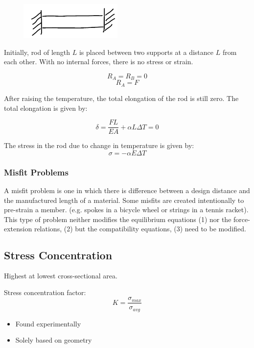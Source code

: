 \begin{figure}[!h]
\centering
\includegraphics[angle=0, width=2in]{Axial Loading-Figures/Temperature_TwoPlates.png}
\vspace{-2mm}
\caption{\small {}}
\vspace{-3mm}
\label{Fig:TempNoLoad}
\end{figure}

\noindent Initially, rod of length $L$ is placed between two supports at a distance $L$ from each other. With no internal forces, there is no stress or strain.

\[R_{A} = R_{B} = 0\]
\[R_{A} = F\]
                  
\noindent After raising the temperature, the total elongation of the rod is still zero. The total elongation is given by:

\[\delta = \frac{FL}{EA} + \alpha L \Delta T = 0\]

\noindent The stress in the rod due to change in temperature is given by:
\[\sigma = -\alpha E \Delta T\]

\subsubsection{Misfit Problems}
A misfit problem is one in which there is difference between a design distance and the manufactured length of a material. Some misfits are created intentionally to pre-strain a member. (e.g. spokes in a bicycle wheel or strings in a tennis racket). This type of problem neither modifies the equilibrium equations (1) nor the force-extension relations, (2) but the compatibility equations, (3) need to be modified.

\subsection{Stress Concentration }

\noindent Highest at lowest cross-sectional area.

Stress concentration factor: \[K = \frac{\sigma_{max}}{\sigma_{avg}}\]

\begin{itemize}
    \item Found experimentally
    \item Solely based on geometry
\end{itemize}

\noindent \textbf{}
